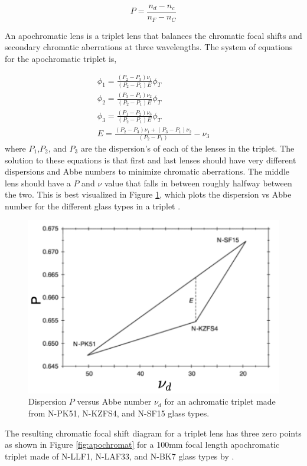 \begin{equation}
    P=\frac{n_d-n_c}{n_F-n_C}
    \label{dispersion}
\end{equation}



An apochromatic lens is a triplet lens that balances the chromatic focal shifts and secondary chromatic aberrations at three wavelengths. The system of equations for the apochromatic triplet is,


\begin{eqnarray}
       \phi_1=\frac{(P_2-P_3)\nu_1}{(P_2-P_1)E}\phi_T \\
       \phi_2=\frac{(P_3-P_1)\nu_2}{(P_2-P_1)E}\phi_T \\
       \phi_3=\frac{(P_1-P_2)\nu_3}{(P_2-P_1)E}\phi_T \\
       E=\frac{(P_2-P_3)\nu_1+(P_3-P_1)\nu_2}{(P_2-P_1)}-\nu_3
\end{eqnarray}
where $P_1$,$P_2$, and $P_3$ are the dispersion's of each of the lenses in the triplet. The solution to these equations is that first and last lenses should have very different dispersions and Abbe numbers to minimize chromatic aberrations. The middle lens should have a $P$ and $\nu$ value that falls in between roughly halfway between the two. This is best visualized in Figure \ref{fig:tripletPV}, which plots the dispersion vs Abbe number for the different glass types in a triplet \citep{kingslake2009lens}. 
\begin{figure}
    \centering
    \includegraphics[width=.6\textwidth]{Chapter Materials/Chapter Three Materials/tripletPV.png}
    \caption{Dispersion $P$ versus Abbe number $\nu_d$ for an achromatic triplet made from N-PK51, N-KZFS4, and N-SF15 glass types.} 
    \label{fig:tripletPV}
\end{figure}

The resulting chromatic focal shift diagram for a triplet lens has three zero points as shown in Figure \ref{fig:apochromat} for a 100mm focal length apochromatic triplet made of N-LLF1, N-LAF33, and N-BK7 glass types by \cite{sasian2017method}. 

